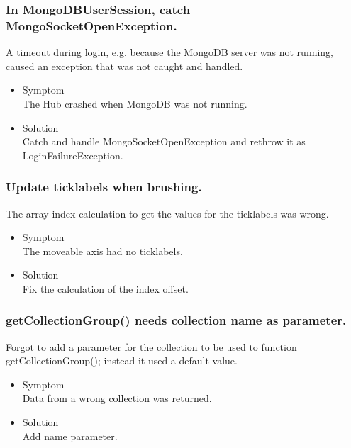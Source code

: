 \documentclass[oneside, english, final]{design}
\begin{document}
\subsubsection{In MongoDBUserSession, catch MongoSocketOpenException.}

A timeout during login, e.g. because the MongoDB server was not running, caused an exception that was not caught and handled.

\begin{itemize}
      \item{Symptom
            \\
            The Hub crashed when MongoDB was not running.
	}
      \item{Solution
            \\
            Catch and handle MongoSocketOpenException and rethrow it as LoginFailureException.
            }
\end{itemize}


\subsubsection{Update ticklabels when brushing.}

The array index calculation to get the values for the ticklabels was wrong.

\begin{itemize}
      \item{Symptom
            \\
            The moveable axis had no ticklabels.
	}
      \item{Solution
            \\
            Fix the calculation of the index offset.
            }
\end{itemize}
\subsubsection{getCollectionGroup() needs collection name as parameter.}

Forgot to add a parameter for the collection to be used to function getCollectionGroup(); instead it used a default value.

\begin{itemize}
      \item{Symptom
            \\
            Data from a wrong collection was returned.
	}
      \item{Solution
            \\
            Add name parameter.
            }
\end{itemize}
\end{document}
